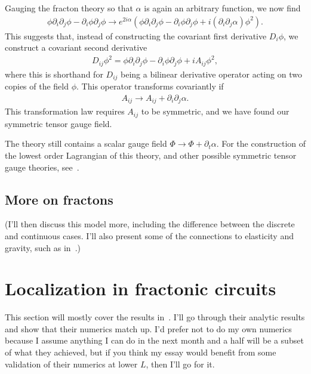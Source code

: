 \documentclass[a4paper,12pt]{article}
\begin{document}
Gauging the fracton theory so that $\alpha$ is again an arbitrary function, we now find
\begin{align}
\phi\partial_i\partial_j\phi-\partial_i\phi\partial_j\phi \to e^{2i\alpha} \left(\phi\partial_i\partial_j\phi-\partial_i\phi\partial_j\phi + i(\partial_i\partial_j\alpha)\phi^2\right).
\end{align}
This suggests that, instead of constructing the covariant first derivative $D_i\phi$, we construct a covariant second derivative 
\begin{align}
D_{ij}\phi^2=\phi\partial_i\partial_j\phi-\partial_i\phi\partial_j\phi + iA_{ij}\phi^2,
\end{align}
where this is shorthand for $D_{ij}$ being a bilinear derivative operator acting on two copies of the field $\phi$. This operator transforms covariantly if 
\begin{align}
A_{ij}\to A_{ij}+\partial_i\partial_j\alpha.
\end{align}
This transformation law requires $A_{ij}$ to be symmetric, and we have found our symmetric tensor gauge field. 

The theory still contains a scalar gauge field $\Phi\to\Phi+\partial_t\alpha$. For the construction of the lowest order Lagrangian of this theory, and other possible symmetric tensor gauge theories, see~\cite{PretkoFractonGauge}.

\subsection{More on fractons} \label{sub:morefrac}

(I'll then discuss this model more, including the difference between the discrete and continuous cases. I'll also present some of the connections to elasticity and gravity, such as in~\cite{PretkoElasticity}.)


\section{Localization in fractonic circuits} \label{sec:fraccirc}

This section will mostly cover the results in~\cite{PaiFracton}. I'll go through their analytic results and show that their numerics match up. I'd prefer not to do my own numerics because I assume anything I can do in the next month and a half will be a subset of what they achieved, but if you think my essay would benefit from some validation of their numerics at lower $L$, then I'll go for it. 
\end{document}
